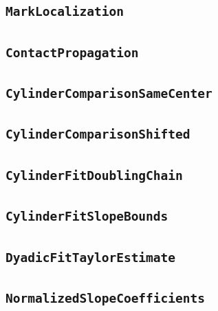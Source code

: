 \documentclass[11pt]{amsart}
\theoremstyle{definition}
\begin{document}
\subsection{\texorpdfstring{\texttt{MarkLocalization}}{MarkLocalization}}\label{node:MarkLocalization}


\subsection{\texorpdfstring{\texttt{ContactPropagation}}{ContactPropagation}}\label{node:ContactPropagation}


\subsection{\texorpdfstring{\texttt{CylinderComparisonSameCenter}}{CylinderComparisonSameCenter}}\label{node:CylinderComparisonSameCenter}


\subsection{\texorpdfstring{\texttt{CylinderComparisonShifted}}{CylinderComparisonShifted}}\label{node:CylinderComparisonShifted}


\subsection{\texorpdfstring{\texttt{CylinderFitDoublingChain}}{CylinderFitDoublingChain}}\label{node:CylinderFitDoublingChain}


\subsection{\texorpdfstring{\texttt{CylinderFitSlopeBounds}}{CylinderFitSlopeBounds}}\label{node:CylinderFitSlopeBounds}


\subsection{\texorpdfstring{\texttt{DyadicFitTaylorEstimate}}{DyadicFitTaylorEstimate}}\label{node:DyadicFitTaylorEstimate}


\subsection{\texorpdfstring{\texttt{NormalizedSlopeCoefficients}}{NormalizedSlopeCoefficients}}\label{node:NormalizedSlopeCoefficients}

\end{document}
